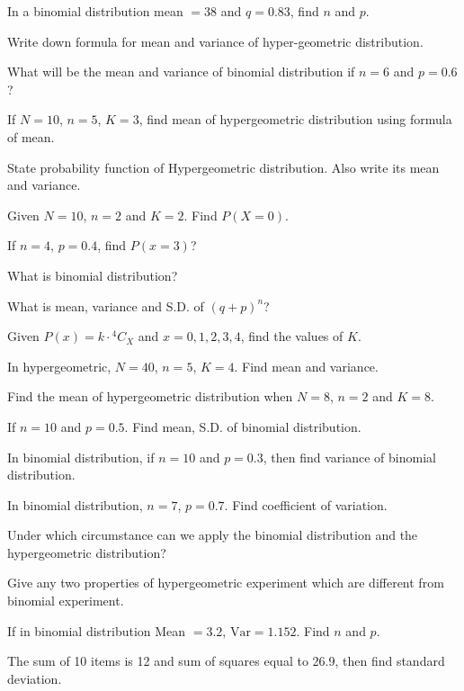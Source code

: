 \documentclass[11pt,a4paper]{article}
\begin{document}
\begin{shortlist}
\item In a binomial distribution mean $=38$ and $q=0.83$, find $n$ and $p$.

\item Write down formula for mean and variance of hyper-geometric distribution.

\item What will be the mean and variance of binomial distribution if $n=6$ and $p=0.6$?

\item If $N=10$, $n=5$, $K=3$, find mean of hypergeometric distribution using formula of mean.

\item State probability function of Hypergeometric distribution. Also write its mean and variance.

\item Given $N=10$, $n=2$ and $K=2$. Find $P(X=0)$.

\item If $n=4$, $p=0.4$, find $P(x=3)$?

\item What is binomial distribution?

\item What is mean, variance and S.D. of $(q+p)^{n}$?

\item Given $P(x)=k\cdot{}^{4}C_{X}$ and $x=0,1,2,3,4$, find the values of $K$.

\item In hypergeometric, $N=40$, $n=5$, $K=4$. Find mean and variance.

\item Find the mean of hypergeometric distribution when $N=8$, $n=2$ and $K=8$.

\item If $n=10$ and $p=0.5$. Find mean, S.D. of binomial distribution.

\item In binomial distribution, if $n=10$ and $p=0.3$, then find variance of binomial distribution.

\item In binomial distribution, $n=7$, $p=0.7$. Find coefficient of variation.

\item Under which circumstance can we apply the binomial distribution and the hypergeometric distribution?

\item Give any two properties of hypergeometric experiment which are different from binomial experiment.

\item If in binomial distribution Mean $=3.2$, $\mathrm{Var}=1.152$. Find $n$ and $p$.

\item The sum of 10 items is 12 and sum of squares equal to 26.9, then find standard deviation.

\end{shortlist}
\end{document}
